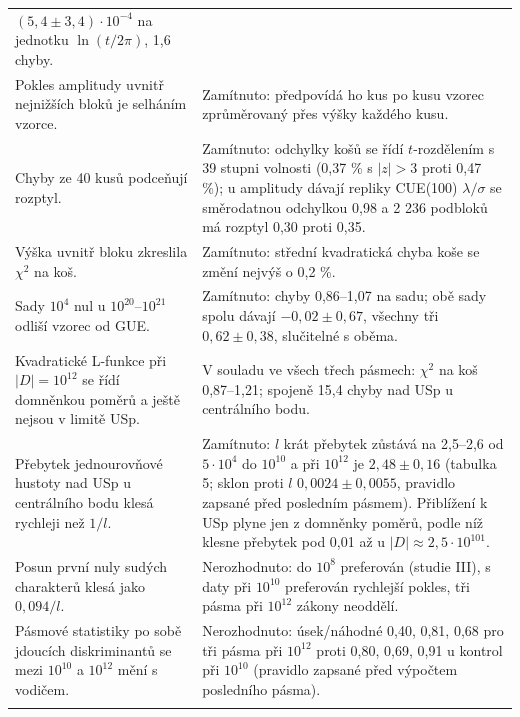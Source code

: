 \documentclass[
  10pt,
]{article}
\begin{document}
{\begin{longtable}[]{@{}
  >{\raggedright\arraybackslash}p{}
  >{\raggedright\arraybackslash}p{}@{}}
\((5{,}4 \pm 3{,}4)\cdot10^{-4}\) na jednotku \(\ln(t/2\pi)\), 1,6
chyby. \\ \addlinespace[2pt]
Pokles amplitudy uvnitř nejnižších bloků je selháním vzorce. &
Zamítnuto: předpovídá ho kus po kusu vzorec zprůměrovaný přes výšky
každého kusu. \\ \addlinespace[2pt]
Chyby ze 40 kusů podceňují rozptyl. & Zamítnuto: odchylky košů se řídí
\(t\)-rozdělením s 39 stupni volnosti (0,37 \% s \(|z| > 3\) proti 0,47
\%); u amplitudy dávají repliky CUE(100) \(\lambda/\sigma\) se
směrodatnou odchylkou 0,98 a 2 236 podbloků má rozptyl 0,30 proti
0,35. \\ \addlinespace[2pt]
Výška uvnitř bloku zkreslila \(\chi^2\) na koš. & Zamítnuto: střední
kvadratická chyba koše se změní nejvýš o 0,2 \%. \\ \addlinespace[2pt]
Sady \(10^4\) nul u \(10^{20}\)--\(10^{21}\) odliší vzorec od GUE. &
Zamítnuto: chyby 0,86--1,07 na sadu; obě sady spolu dávají
\(-0{,}02 \pm 0{,}67\), všechny tři \(0{,}62 \pm 0{,}38\), slučitelné s
oběma. \\ \addlinespace[2pt]
Kvadratické L-funkce při \(|D| = 10^{12}\) se řídí domněnkou poměrů a
ještě nejsou v limitě USp. & V souladu ve všech třech pásmech:
\(\chi^2\) na koš 0,87--1,21; spojeně 15,4 chyby nad USp u centrálního
bodu. \\ \addlinespace[2pt]
Přebytek jednourovňové hustoty nad USp u centrálního bodu klesá rychleji
než \(1/l\). & Zamítnuto: \(l\) krát přebytek zůstává na 2,5--2,6 od
\(5\cdot10^4\) do \(10^{10}\) a při \(10^{12}\) je \(2{,}48 \pm 0{,}16\)
(tabulka 5; sklon proti \(l\) \(0{,}0024 \pm 0{,}0055\), pravidlo
zapsané před posledním pásmem). Přiblížení k USp plyne jen z domněnky
poměrů, podle níž klesne přebytek pod 0,01 až u
\(|D| \approx 2{,}5\cdot10^{101}\). \\ \addlinespace[2pt]
Posun první nuly sudých charakterů klesá jako \(0{,}094/l\). &
Nerozhodnuto: do \(10^8\) preferován (studie III), s daty při
\(10^{10}\) preferován rychlejší pokles, tři pásma při \(10^{12}\)
zákony neoddělí. \\ \addlinespace[2pt]
Pásmové statistiky po sobě jdoucích diskriminantů se mezi \(10^{10}\) a
\(10^{12}\) mění s vodičem. & Nerozhodnuto: úsek/náhodné 0,40, 0,81,
0,68 pro tři pásma při \(10^{12}\) proti 0,80, 0,69, 0,91 u kontrol při
\(10^{10}\) (pravidlo zapsané před výpočtem posledního pásma). \\ \addlinespace[2pt]
\end{longtable}}
\end{document}
